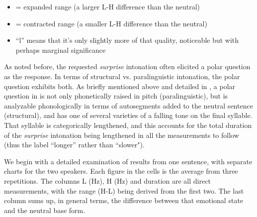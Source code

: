 \documentclass[output=paper]{langsci/langscibook}
\begin{document}
\begin{itemize}
\item \EXP = expanded range (a larger L-H difference than the neutral)
\item \CONT = contracted range (a smaller L-H difference than the neutral)
\item ``l'' means that it's only slightly more of that quality, noticeable but with perhaps marginal significance 
\end{itemize}

As noted before, the requested \emph{surprise} intonation often elicited a polar question as the response. In terms of structural vs. paralinguistic intonation, the polar question exhibits both. As briefly mentioned above and detailed in \citet{cahill2012}, a polar question in  is not only phonetically raised in pitch (paralinguistic), but is analyzable phonologically in terms of autosegments added to the neutral sentence (structural), and has one of several varieties of a falling tone on the final syllable. That syllable is categorically lengthened, and this accounts for the total duration of the \emph{surprise} intonation being lengthened in all the measurements to follow (thus the label ``longer'' rather than ``slower").



We begin with a detailed examination of results from one sentence, with separate charts for the two speakers. Each figure in the cells is the average from three repetitions. The columns L (Hz), H (Hz) and duration are all direct measurements, with the range (H-L) being derived from the first two. The last column sums up, in general terms, the difference between that emotional state and the neutral base form. 




\begin{table}

\caption{`S/he has cooked yams' \emph{ù dìgìwó nyʊ́à} (Solomon)}
\label{tab:3.cahill}

\end{table}
\end{document}
